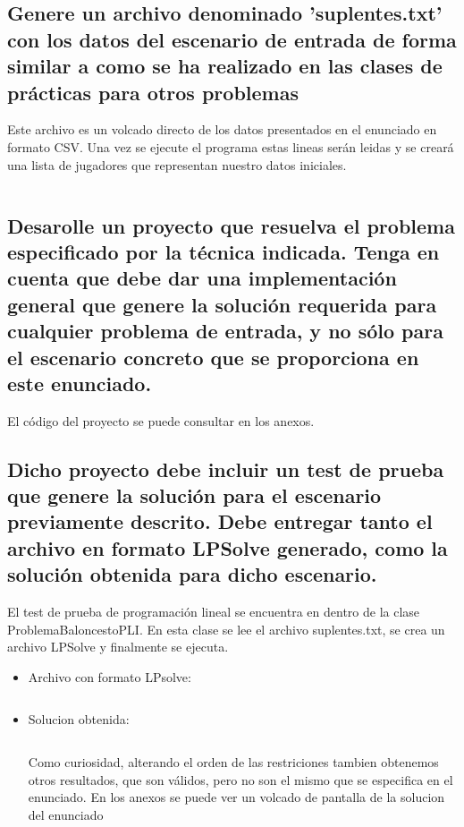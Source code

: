 \documentclass[a4paper,12pt]{article}
\begin{document}
\subsection{Genere un archivo denominado 'suplentes.txt' con los datos del escenario de entrada
de forma similar a como se ha realizado en las clases de prácticas para otros problemas}
Este archivo es un volcado directo de los datos presentados en el enunciado en formato CSV.
Una vez se ejecute el programa estas lineas serán leidas y se creará una lista de jugadores que representan nuestro datos iniciales.

\inputminted[breaklines]{text}{ficheros/suplentes.txt}

\subsection{Desarolle un proyecto que resuelva el problema especificado por la técnica indicada.
Tenga en cuenta que debe dar una implementación general que genere la solución requerida para
cualquier problema de entrada, y no sólo para el escenario concreto que se proporciona en este enunciado.}
El código del proyecto se puede consultar en los anexos.

\subsection{Dicho proyecto debe incluir un test de prueba que genere la solución para el escenario previamente descrito.
Debe entregar tanto el archivo en formato LPSolve generado, como la solución obtenida para dicho escenario.}
El test de prueba de programación lineal se encuentra en dentro de la clase ProblemaBaloncestoPLI. En esta clase se lee el
archivo suplentes.txt, se crea un archivo LPSolve y finalmente se ejecuta.
\begin{itemize}
  \item Archivo con formato LPsolve:
  \inputminted[fontsize=\footnotesize,breaklines]{text}{ficheros/ArchivoLPSolveGenerado.txt}
  \item Solucion obtenida:
  \inputminted[fontsize=\footnotesize,breaklines]{text}{ficheros/Solucion.txt}

Como curiosidad, alterando el orden de las restriciones tambien obtenemos otros resultados, que son válidos, pero no son el mismo que se especifica en el enunciado.
En los anexos se puede ver un volcado de pantalla de la solucion del enunciado

\end{itemize}
\end{document}
